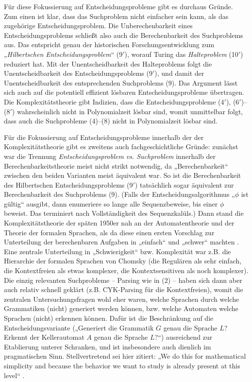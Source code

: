 Für diese Fokussierung auf Entscheidungsprobleme gibt es durchaus Gründe. Zum einen ist klar, dass das Suchproblem nicht einfacher sein kann, als das zugehörige Entscheidungsproblem. Die Unberechenbarkeit eines Entscheidungsproblems schließt also auch die Berechenbarkeit des Suchproblems aus. Das entspricht genau der historischen Forschungsentwicklung zum „\emph{Hilbertschen Entscheidungsproblem}“ (9$'$), worauf Turing das \emph{Halteproblem} (10$'$) reduziert hat. Mit der Unentscheidbarkeit des  Halteproblems folgt die Unentscheidbarkeit des Entscheidungsproblems (9$'$), und damit der Unentscheidbarkeit des entsprechenden Suchproblems (9). 
Das Argument lässt sich auch auf die potentiell effizient lösbaren Entscheidungsprobleme übertragen. Die Komplexitätstheorie gibt Indizien, dass die Entscheidungsprobleme (4$'$), (6$'$)–(8$'$) wahrscheinlich nicht in Polynomialzeit lösbar sind, womit unmittelbar folgt, dass auch die Suchprobleme (4)–(8) nicht in Polynomialzeit lösbar sind.

\pagebreak[3]
Für die Fokussierung auf Entscheidungsprobleme innerhalb der der Komplexitätstheorie gibt es zweitens auch fachgeschichtliche Gründe: zunächst war die Trennung \emph{Entscheidungsproblem vs. Suchproblem} innerhalb der Berechenbarkeitstheorie meist nicht strikt notwendig, da „Berechenbarkeit“ zwischen den beiden Varianten meist äquivalent war. So ist die Berechenbarkeit des Hilbertschen Entscheidungsproblems (9$'$) tatsächlich sogar äquivalent zur Berechenbarkeit des Suchproblems (9). (Falls der Entscheidungsalgorithmus „$\phi$ ist gültig“ ausgibt, dann enumeriere so lange alle Sequenzbeweise, bis einer $\phi$ beweist. Das terminiert nach Vollständigkeit des Sequenzkalüls.)
Dann stand die Komplexitätstheorie der späten 1950er nah an der Automatentheorie und der Theorie der formalen Sprachen, als da diese einen ersten Vorschlag zur Unterteilung 
 der berechenbaren Aufgaben in „einfach“ und „schwer“ machten \parencite[vgl.][]{koucky_automata_2023}. Eine zentrale Unterteilung in „Schwierigkeit“ bzw. Komplexität war z.B. die Hierarchie der formalen Sprachen von Chomsky (die Regulären als sehr einfach, die Kontextfreien als etwas komplexer, die Kontextsensitiven als noch komplexer). %
Die einzig relevanten Suchprobleme – Parsing wie in (2) – haben sich dann aber auch relativ schnell geklärt (z.B. CYK-Parsing für die Kontextfreien), womit die zentralen Untersuchungsfragen wohl eher waren, welche Sprachen durch welche Grammatiken (nicht) generiert werden können, bzw. welche Automaten welche Sprachen (nicht) erkennen können. Dafür ist die Beschränkung auf die Entscheidungsvariante („Generiert die Grammatik $G$ genau die Sprache $L$? Erkennt der Kellerautomat $A$ genau die Sprache $L$?“) ausreichend zur Etablierung unterer Schranken, und ist insbesondere auch dienlich im pragmatischen Sinn. Stellvertretend sei hier \citeauthor{kozen_automata_1997} zitiert: „We do this for mathematical simplicity and because the behavior we want to study is already present at this level“ \parencite*[7]{kozen_automata_1997}.

